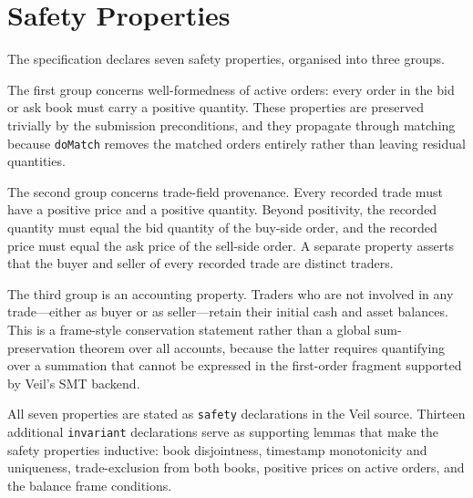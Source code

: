 \section{Safety Properties}

The specification declares seven safety properties, organised into three
groups.

The first group concerns well-formedness of active orders: every order in the
bid or ask book must carry a positive quantity. These properties are preserved
trivially by the submission preconditions, and they propagate through matching
because \texttt{doMatch} removes the matched orders entirely rather than
leaving residual quantities.

The second group concerns trade-field provenance. Every recorded trade must
have a positive price and a positive quantity. Beyond positivity, the recorded
quantity must equal the bid quantity of the buy-side order, and the recorded
price must equal the ask price of the sell-side order. A separate property
asserts that the buyer and seller of every recorded trade are distinct traders.

The third group is an accounting property. Traders who are not involved in any
trade---either as buyer or as seller---retain their initial cash and asset
balances. This is a frame-style conservation statement rather than a global
sum-preservation theorem over all accounts, because the latter requires
quantifying over a summation that cannot be expressed in the first-order
fragment supported by Veil's SMT backend.

All seven properties are stated as \texttt{safety} declarations in the Veil
source. Thirteen additional \texttt{invariant} declarations serve as
supporting lemmas that make the safety properties inductive: book disjointness,
timestamp monotonicity and uniqueness, trade-exclusion from both books,
positive prices on active orders, and the balance frame conditions.
